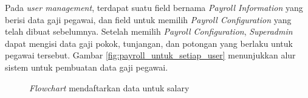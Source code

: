 Pada \textit{user management}, terdapat suatu field bernama \textit{Payroll Information} yang berisi data gaji pegawai, dan field untuk memilih \textit{Payroll Configuration} yang telah dibuat sebelumnya. Setelah memilih \textit{Payroll Configuration}, \textit{Superadmin} dapat mengisi data gaji pokok, tunjangan, dan potongan yang berlaku untuk pegawai tersebut. Gambar \ref{fig:payroll_untuk_setiap_user} menunjukkan alur sistem untuk pembuatan data gaji pegawai.

\begin{figure}[H]
    \centering
    \caption{\textit{Flowchart} mendaftarkan data untuk salary}
    \label{fig:mendaftarkan_data_untuk_salary}
\end{figure}

